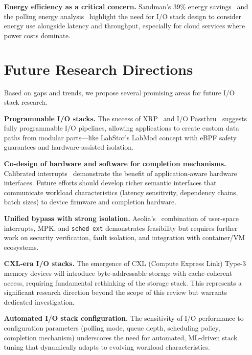\documentclass[conference]{IEEEtran}
\begin{document}
\textbf{Energy efficiency as a critical concern.} Sandman's 39\% energy savings~\cite{zhou2025sandman} and the polling energy analysis~\cite{wang2022pollvsenergy} highlight the need for I/O stack design to consider energy use alongside latency and throughput, especially for cloud services where power costs dominate.


\section{Future Research Directions}
\label{sec:future}

Based on gaps and trends, we propose several promising areas for future I/O stack research.

\textbf{Programmable I/O stacks.} The success of XRP~\cite{zhong2022xrp} and I/O Passthru~\cite{joshi2024iopassthru} suggests fully programmable I/O pipelines, allowing applications to create custom data paths from modular parts---like LabStor's LabMod concept with eBPF safety guarantees and hardware-assisted isolation.

\textbf{Co-design of hardware and software for completion mechanisms.} Calibrated interrupts~\cite{yang2022calibrated} demonstrate the benefit of application-aware hardware interfaces. Future efforts should develop richer semantic interfaces that communicate workload characteristics (latency sensitivity, dependency chains, batch sizes) to device firmware and completion hardware.

\textbf{Unified bypass with strong isolation.} Aeolia's~\cite{zhou2025aeolia} combination of user-space interrupts, MPK, and \texttt{sched\_ext} demonstrates feasibility but requires further work on security verification, fault isolation, and integration with container/VM ecosystems.

\textbf{CXL-era I/O stacks.} The emergence of CXL (Compute Express Link) Type-3 memory devices will introduce byte-addressable storage with cache-coherent access, requiring fundamental rethinking of the storage stack. This represents a significant research direction beyond the scope of this review but warrants dedicated investigation.

\textbf{Automated I/O stack configuration.} The sensitivity of I/O performance to configuration parameters (polling mode, queue depth, scheduling policy, completion mechanism) underscores the need for automated, ML-driven stack tuning that dynamically adapts to evolving workload characteristics.
\end{document}
